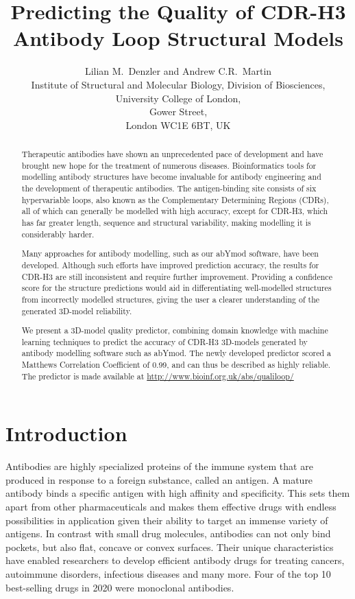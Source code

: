 \documentclass[12pt]{article}
\title{Predicting the Quality of CDR-H3 Antibody Loop Structural Models}
\author{Lilian M.\ Denzler and Andrew C.R.\ Martin\\
Institute of Structural and Molecular Biology, Division of Biosciences,\\
University College of London,\\
Gower Street,\\
London WC1E 6BT, UK
}
\begin{document}
\maketitle

\begin{abstract}
  Therapeutic antibodies have shown an unprecedented pace of
  development and have brought new hope for the treatment of numerous
  diseases. Bioinformatics tools for modelling antibody structures
  have become invaluable for antibody engineering and the development
  of therapeutic antibodies. The antigen-binding site consists of six
  hypervariable loops, also known as the Complementary Determining
  Regions (CDRs), all of which can generally be modelled with high accuracy,
  except for CDR-H3, which has
  far greater length, sequence and structural variability, 
  making modelling it is considerably harder.

  Many approaches for antibody modelling, such as our
  abYmod software, have been developed. Although such efforts have
  improved prediction accuracy, the results for CDR-H3 are
  still inconsistent and require further improvement. Providing a
  confidence score for the structure predictions would aid in
  differentiating well-modelled structures from incorrectly modelled
  structures, giving the user a clearer understanding of the
  generated 3D-model reliability.

  We present a 3D-model quality predictor, combining domain knowledge
  with machine learning techniques to predict the accuracy of CDR-H3
  3D-models generated by antibody modelling software such as abYmod. The
  newly developed predictor scored a Matthews Correlation Coefficient
  of 0.99, and can thus be described as highly reliable. The predictor
  is made available at \url{http://www.bioinf.org.uk/abs/qualiloop/}
\end{abstract}

\section{Introduction}

Antibodies are highly specialized proteins of the immune system that
are produced in response to a foreign substance, called an antigen. A
mature antibody binds a specific antigen with high affinity and specificity. This sets them apart from other pharmaceuticals and makes them effective drugs with endless possibilities in application given their ability to target an immense variety of antigens.
In contrast with small drug molecules, antibodies can not
only bind pockets, but also flat, concave or convex
surfaces\cite{MacCallum1996}. Their unique characteristics have enabled 
researchers to develop efficient antibody drugs for treating cancers,
autoimmune disorders, infectious diseases and many more\cite{Lu2020}.
Four of the top 10 best-selling drugs in
2020 were monoclonal antibodies\cite{Urquhart2021}.
\end{document}
